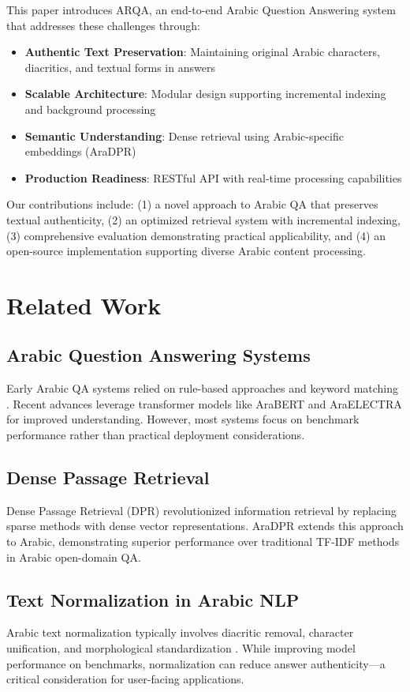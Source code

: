 \documentclass[conference]{IEEEtran}
\begin{document}
This paper introduces ARQA, an end-to-end Arabic Question Answering system that addresses these challenges through:
\begin{itemize}
    \item \textbf{Authentic Text Preservation}: Maintaining original Arabic characters, diacritics, and textual forms in answers
    \item \textbf{Scalable Architecture}: Modular design supporting incremental indexing and background processing
    \item \textbf{Semantic Understanding}: Dense retrieval using Arabic-specific embeddings (AraDPR)
    \item \textbf{Production Readiness}: RESTful API with real-time processing capabilities
\end{itemize}

Our contributions include: (1) a novel approach to Arabic QA that preserves textual authenticity, (2) an optimized retrieval system with incremental indexing, (3) comprehensive evaluation demonstrating practical applicability, and (4) an open-source implementation supporting diverse Arabic content processing.

\section{Related Work}

\subsection{Arabic Question Answering Systems}
Early Arabic QA systems relied on rule-based approaches and keyword matching \cite{b2}. Recent advances leverage transformer models like AraBERT \cite{b3} and AraELECTRA \cite{b4} for improved understanding. However, most systems focus on benchmark performance rather than practical deployment considerations.

\subsection{Dense Passage Retrieval}
Dense Passage Retrieval (DPR) \cite{b5} revolutionized information retrieval by replacing sparse methods with dense vector representations. AraDPR \cite{b6} extends this approach to Arabic, demonstrating superior performance over traditional TF-IDF methods in Arabic open-domain QA.

\subsection{Text Normalization in Arabic NLP}
Arabic text normalization typically involves diacritic removal, character unification, and morphological standardization \cite{b7}. While improving model performance on benchmarks, normalization can reduce answer authenticity—a critical consideration for user-facing applications.
\end{document}
